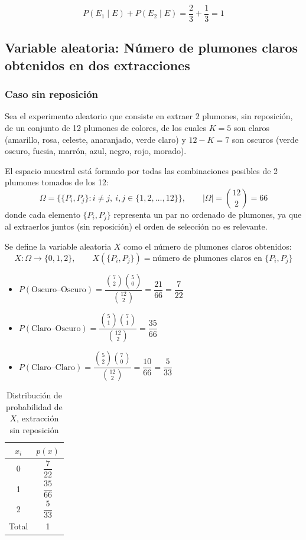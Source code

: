 \documentclass[10pt,letterpaper]{article}
\begin{document}
$$
P(E_1\mid E)+P(E_2\mid E)=\frac{2}{3}+\frac{1}{3}=1
$$

\subsection{Variable aleatoria: Número de plumones claros obtenidos en dos extracciones }

\subsubsection{Caso sin reposición}

Sea el experimento aleatorio que consiste en extraer 2 plumones, sin reposición, de un conjunto de 12 plumones de colores, de los cuales $K=5$ son claros (amarillo, rosa, celeste, anaranjado, verde claro) y $12-K=7$ son oscuros (verde oscuro, fucsia, marrón, azul, negro, rojo, morado).

El espacio muestral está formado por todas las combinaciones posibles de 2 plumones tomados de los 12:
\begin{equation}
    \Omega = \{\{P_i, P_j\} : i \neq j,\ i,j \in \{1,2,\dots,12\}\}, \qquad |\Omega| = \binom{12}{2} = 66
\end{equation}
donde cada elemento $\{P_i, P_j\}$ representa un par no ordenado de plumones, ya que al extraerlos juntos (sin reposición) el orden de selección no es relevante.

Se define la variable aleatoria $X$ como el número de plumones claros obtenidos:
\begin{equation}
    X: \Omega \rightarrow \{0,1,2\}, \qquad X(\{P_i,P_j\}) = \text{número de plumones claros en } \{P_i,P_j\}
\end{equation}

\begin{itemize}
    \item $P(\text{Oscuro--Oscuro}) =
    \dfrac{\binom{7}{2}\binom{5}{0}}{\binom{12}{2}}
    = \dfrac{21}{66} = \dfrac{7}{22}$

    \item $P(\text{Claro--Oscuro}) =
    \dfrac{\binom{5}{1}\binom{7}{1}}{\binom{12}{2}}
    = \dfrac{35}{66}$

    \item $P(\text{Claro--Claro}) =
    \dfrac{\binom{5}{2}\binom{7}{0}}{\binom{12}{2}}
    = \dfrac{10}{66} = \dfrac{5}{33}$
\end{itemize}

\begin{table}[h]
    \centering
    \begin{tabular}{|c|c|}
        \hline
        $x_i$ & $p(x)$ \\
        \hline
        0 & $\dfrac{7}{22}$ \\[10pt]
        1 & $\dfrac{35}{66}$ \\[10pt]
        2 & $\dfrac{5}{33}$ \\
        \hline
        Total & 1 \\
        \hline
    \end{tabular}
    \caption{Distribución de probabilidad de $X$, extracción sin reposición}
\end{table}
\end{document}
